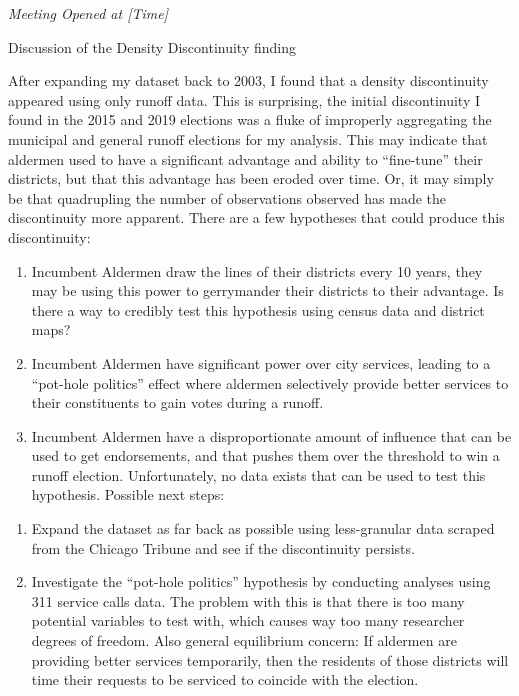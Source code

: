 \documentclass[10pt,a4paper,twoside]{mins}
\begin{document}
\begin{minutes}
\begin{center}\emph{Meeting Opened at [Time]}\end{center}
\begin{business}
\item Discussion of the Density Discontinuity finding

After expanding my dataset back to 2003, I found that a density discontinuity appeared using only runoff data. 
This is surprising, the initial discontinuity I found in the 2015 and 2019 elections was a fluke of improperly aggregating the municipal and general runoff elections for my analysis. 
This may indicate that aldermen used to have a significant advantage and ability to ``fine-tune'' their districts, but that this advantage has been eroded over time.
Or, it may simply be that quadrupling the number of observations observed has made the discontinuity more apparent.
There are a few hypotheses that could produce this discontinuity:
\begin{enumerate}
    \item Incumbent Aldermen draw the lines of their districts every 10 years, they may be using this power to gerrymander their districts to their advantage. Is there a way to credibly test this hypothesis using census data and district maps?
    \item Incumbent Aldermen have significant power over city services, leading to a ``pot-hole politics'' effect where aldermen selectively provide better services to their constituents to gain votes during a runoff. 
    \item Incumbent Aldermen have a disproportionate amount of influence that can be used to get endorsements, and that pushes them over the threshold to win a runoff election. Unfortunately, no data exists that can be used to test this hypothesis.
    Possible next steps:
\end{enumerate}
\begin{enumerate}
    \item Expand the dataset as far back as possible using less-granular data scraped from the Chicago Tribune and see if the discontinuity persists. 
    \item Investigate the ``pot-hole politics'' hypothesis by conducting analyses using 311 service calls data. 
    The problem with this is that there is too many potential variables to test with, which causes way too many researcher degrees of freedom. Also general equilibrium concern: If aldermen are providing better services temporarily, then the residents of those districts will time their requests to be serviced to coincide with the election.


\end{enumerate}
\end{business}
\end{minutes}
\end{document}
